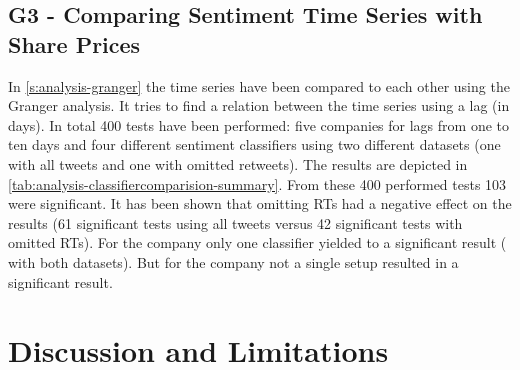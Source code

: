 \subsection{G3 - Comparing Sentiment Time Series with Share Prices}
\label{ss:conclusion-summary-g3}



In \cref{s:analysis-granger} the time series have been compared to each other using the Granger analysis.
It tries to find a relation between the time series using a lag (in days).
In total 400 tests have been performed: five companies for lags from one to ten days and four different sentiment classifiers using two different datasets (one with all tweets and one with omitted retweets).
The results are depicted in \cref{tab:analysis-classifiercomparision-summary}.
From these 400 performed tests 103 were significant.
It has been shown that omitting \acp{RT} had a negative effect on the results (61 significant tests using all tweets versus 42 significant tests with omitted \acp{RT}).
For the company \ford{} only one classifier yielded to a significant result (\fnb{} with both datasets).
But for the company \toyota{} not a single setup resulted in a significant result.

\section{Discussion and Limitations}
\label{s:conclusions-discussion}

